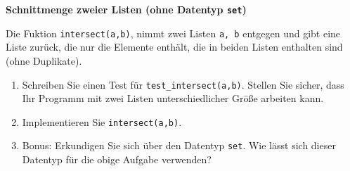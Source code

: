 \textbf{Schnittmenge zweier Listen (ohne Datentyp \texttt{set})}

 Die Fuktion \verb|intersect(a,b)|, nimmt zwei Listen \verb|a, b| entgegen und gibt eine Liste zurück, die nur die Elemente enthält, die in beiden Listen enthalten sind (ohne Duplikate). 
\begin{enumerate}
	\item Schreiben Sie einen Test für \verb|test_intersect(a,b)|. Stellen Sie sicher, dass Ihr Programm mit zwei Listen unterschiedlicher Größe arbeiten kann.
	\item Implementieren Sie  \verb|intersect(a,b)|.
	\item Bonus: Erkundigen Sie sich über den Datentyp \texttt{set}. Wie lässt sich dieser Datentyp für die obige Aufgabe verwenden?
\end{enumerate}